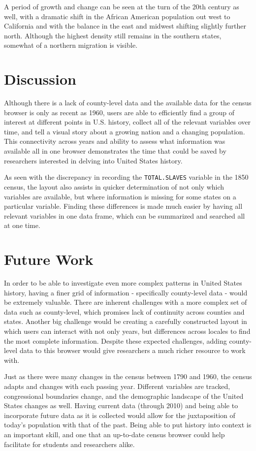 \documentclass[11pt,]{article}
\begin{document}
A period of growth and change can be seen at the turn of the 20th
century as well, with a dramatic shift in the African American
population out west to California and with the balance in the east and
midwest shifting slightly further north. Although the highest density
still remains in the southern states, somewhat of a northern migration
is visible.

\section{Discussion}

Although there is a lack of county-level data and the available data for
the census browser is only as recent as 1960, users are able to
efficiently find a group of interest at different points in U.S.
history, collect all of the relevant variables over time, and tell a
visual story about a growing nation and a changing population. This
connectivity across years and ability to assess what information was
available all in one browser demonstrates the time that could be saved
by researchers interested in delving into United States history.

As seen with the discrepancy in recording the \texttt{TOTAL.SLAVES}
variable in the 1850 census, the layout also assists in quicker
determination of not only which variables are available, but where
information is missing for some states on a particular variable. Finding
these differences is made much easier by having all relevant variables
in one data frame, which can be summarized and searched all at one time.

\section{Future Work}

In order to be able to investigate even more complex patterns in United
States history, having a finer grid of information - specifically
county-level data - would be extremely valuable. There are inherent
challenges with a more complex set of data such as county-level, which
promises lack of continuity across counties and states. Another big
challenge would be creating a carefully constructed layout in which
users can interact with not only years, but differences across locales
to find the most complete information. Despite these expected
challenges, adding county-level data to this browser would give
researchers a much richer resource to work with.

Just as there were many changes in the census between 1790 and 1960, the
census adapts and changes with each passing year. Different variables
are tracked, congressional boundaries change, and the demographic
landscape of the United States changes as well. Having current data
(through 2010) and being able to incorporate future data as it is
collected would allow for the juxtaposition of today's population with
that of the past. Being able to put history into context is an important
skill, and one that an up-to-date census browser could help facilitate
for students and researchers alike.
\end{document}
